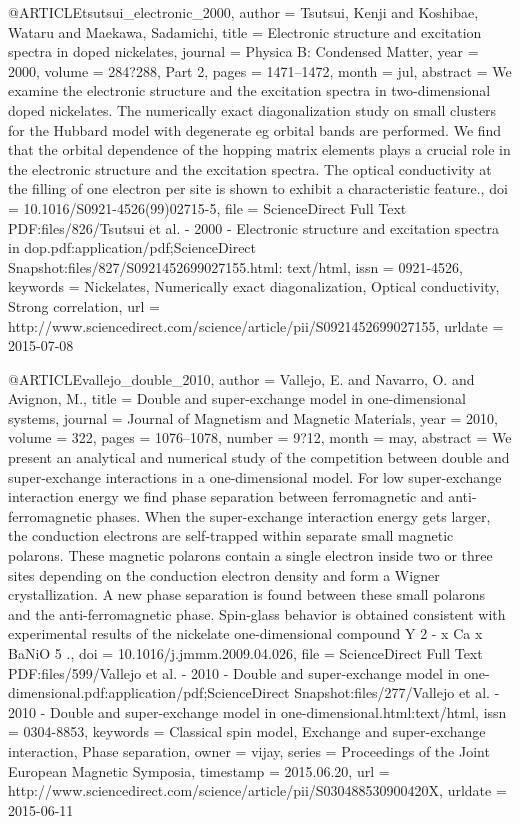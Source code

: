 @ARTICLE{tsutsui_electronic_2000,
  author = {Tsutsui, Kenji and Koshibae, Wataru and Maekawa, Sadamichi},
  title = {Electronic structure and excitation spectra in doped nickelates},
  journal = {Physica B: Condensed Matter},
  year = {2000},
  volume = {284?288, Part 2},
  pages = {1471--1472},
  month = jul,
  abstract = {We examine the electronic structure and the excitation spectra in
	two-dimensional doped nickelates. The numerically exact diagonalization
	study on small clusters for the Hubbard model with degenerate eg
	orbital bands are performed. We find that the orbital dependence
	of the hopping matrix elements plays a crucial role in the electronic
	structure and the excitation spectra. The optical conductivity at
	the filling of one electron per site is shown to exhibit a characteristic
	feature.},
  doi = {10.1016/S0921-4526(99)02715-5},
  file = {ScienceDirect Full Text PDF:files/826/Tsutsui et al. - 2000 - Electronic structure and         excitation spectra in dop.pdf:application/pdf;ScienceDirect Snapshot:files/827/S0921452699027155.html:    text/html},
  issn = {0921-4526},
  keywords = {Nickelates, Numerically exact diagonalization, Optical conductivity,
	Strong correlation},
  url = {http://www.sciencedirect.com/science/article/pii/S0921452699027155},
  urldate = {2015-07-08}
}

@ARTICLE{vallejo_double_2010,
  author = {Vallejo, E. and Navarro, O. and Avignon, M.},
  title = {Double and super-exchange model in one-dimensional systems},
  journal = {Journal of Magnetism and Magnetic Materials},
  year = {2010},
  volume = {322},
  pages = {1076--1078},
  number = {9?12},
  month = may,
  abstract = {We present an analytical and numerical study of the competition between
	double and super-exchange interactions in a one-dimensional model.
	For low super-exchange interaction energy we find phase separation
	between ferromagnetic and anti-ferromagnetic phases. When the super-exchange
	interaction energy gets larger, the conduction electrons are self-trapped
	within separate small magnetic polarons. These magnetic polarons
	contain a single electron inside two or three sites depending on
	the conduction electron density and form a Wigner crystallization.
	A new phase separation is found between these small polarons and
	the anti-ferromagnetic phase. Spin-glass behavior is obtained consistent
	with experimental results of the nickelate one-dimensional compound
	Y 2 - x Ca x BaNiO 5 .},
  doi = {10.1016/j.jmmm.2009.04.026},
  file = {ScienceDirect Full Text PDF:files/599/Vallejo et al. - 2010 - Double and super-exchange model in one-dimensional.pdf:application/pdf;ScienceDirect Snapshot:files/277/Vallejo et al. - 2010 - Double and super-exchange model in one-dimensional.html:text/html},
  issn = {0304-8853},
  keywords = {Classical spin model, Exchange and super-exchange interaction, Phase
	separation},
  owner = {vijay},
  series = {Proceedings of the {Joint} {European} {Magnetic} {Symposia}},
  timestamp = {2015.06.20},
  url = {http://www.sciencedirect.com/science/article/pii/S030488530900420X},
  urldate = {2015-06-11}
}

